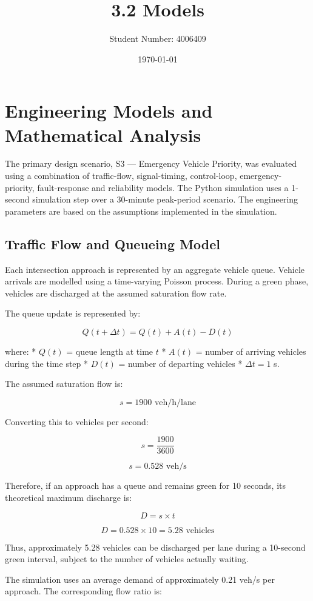 \documentclass{article}
\title{3.2 Models}
\author{Student Number: 4006409}
\date{\today}
\begin{document}
\maketitle
\section{Engineering Models and Mathematical Analysis}

The primary design scenario, S3 — Emergency Vehicle Priority, was evaluated using a combination of traffic-flow, signal-timing, control-loop, emergency-priority, fault-response and reliability models. The Python simulation uses a 1-second simulation step over a 30-minute peak-period scenario. The engineering parameters are based on the assumptions implemented in the simulation.

\subsection{Traffic Flow and Queueing Model}

Each intersection approach is represented by an aggregate vehicle queue. Vehicle arrivals are modelled using a time-varying Poisson process. During a green phase, vehicles are discharged at the assumed saturation flow rate.

The queue update is represented by:

$$
Q(t+\Delta t)=Q(t)+A(t)-D(t)
$$

where:
* \(Q(t)\) = queue length at time \(t\)
* \(A(t)\) = number of arriving vehicles during the time step
* \(D(t)\) = number of departing vehicles
* \(\Delta t=1\) s.

The assumed saturation flow is:

$$
s=1900\text{ veh/h/lane}
$$

Converting this to vehicles per second:

$$
s=\frac{1900}{3600}
$$

$$
\boxed{s=0.528\text{ veh/s}}
$$

Therefore, if an approach has a queue and remains green for 10 seconds, its theoretical maximum discharge is:

$$
D=s\times t
$$

$$
D=0.528\times10=5.28\text{ vehicles}
$$

Thus, approximately 5.28 vehicles can be discharged per lane during a 10-second green interval, subject to the number of vehicles actually waiting.

The simulation uses an average demand of approximately 0.21 veh/s per approach. The corresponding flow ratio is:
\end{document}
